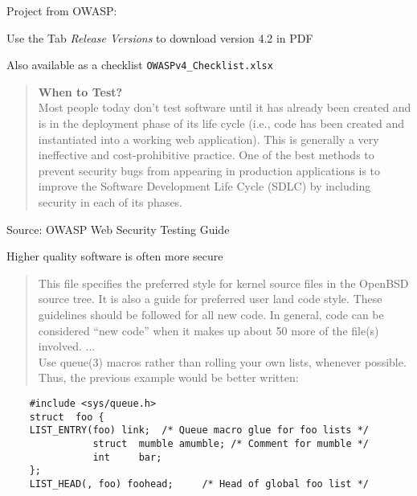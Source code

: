 \documentclass[Screen16to9,17pt]{foils}
\begin{document}
\begin{list2}
\item Project from OWASP:\\
\item Use the Tab \emph{Release Versions} to download version 4.2 in PDF
\item Also available as a checklist \verb+OWASPv4_Checklist.xlsx+
\end{list2}




\begin{quote}\small{\bf
When to Test?}\\
Most people today don’t test software until it has already been created and is in the deployment phase of its life cycle (i.e., code has been created and instantiated into a working web application). This is generally a very ineffective and cost-prohibitive practice. One of the best methods to prevent security bugs from appearing in production applications is to improve the Software Development Life Cycle (SDLC) by including security in each of its phases.
\end{quote}
Source: OWASP Web Security Testing Guide



\centerline{Higher quality software is often more secure}


\begin{quote}
This file specifies the preferred style for kernel source files in the
OpenBSD source tree.  It is also a guide for preferred user land code
style.  These guidelines should be followed for all new code.  In general,
code can be considered ``new code'' when it makes up about 50%
more of the file(s) involved. ...\\
Use queue(3) macros rather than rolling your own lists, whenever possible.
Thus, the previous example would be better written:
\end{quote}

\begin{verbatim}
    #include <sys/queue.h>
    struct  foo {
    LIST_ENTRY(foo) link;  /* Queue macro glue for foo lists */
               struct  mumble amumble; /* Comment for mumble */
               int     bar;
    };
    LIST_HEAD(, foo) foohead;     /* Head of global foo list */
\end{verbatim}
\end{document}
